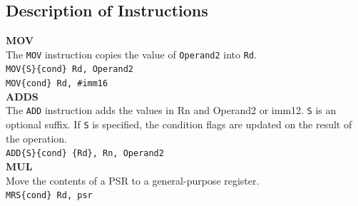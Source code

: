 \documentclass[footheight=20pt, footsepline, headheight=20pt, headsepline]{scrartcl}
\begin{document}
\subsection*{Description of Instructions}
\textbf{MOV}\\The \verb|MOV| instruction copies the value of \verb|Operand2| into \verb|Rd|.\\
\verb|MOV{S}{cond} Rd, Operand2|\\
\verb|MOV{cond} Rd, #imm16|\\
\textbf{ADDS}\\
The \verb|ADD| instruction adds the values in Rn and Operand2 or imm12. \verb|S| is an optional suffix. If \verb|S| is specified, the condition flags are updated on the result of the operation.\\
\verb|ADD{S}{cond} {Rd}, Rn, Operand2|\\
\textbf{MUL}\\
Move the contents of a PSR to a general-purpose register.\\
\verb |MRS{cond} Rd, psr|\\




\FloatBarrier
\end{document}
